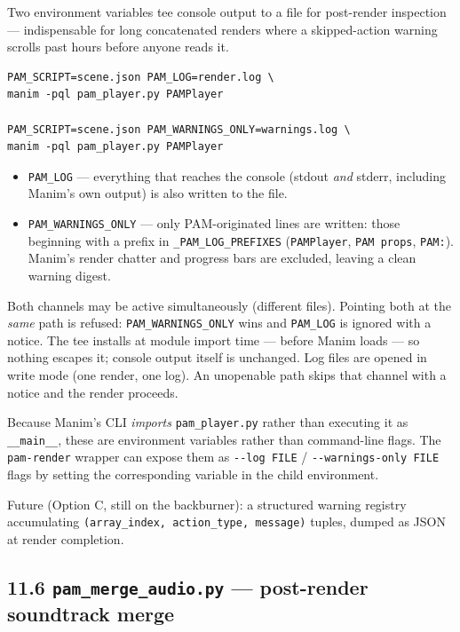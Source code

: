 \documentclass[
  11pt,
]{book}
\begin{document}
Two environment variables tee console output to a file for
post-render inspection --- indispensable for long concatenated
renders where a skipped-action warning scrolls past hours before
anyone reads it.

\begin{verbatim}
PAM_SCRIPT=scene.json PAM_LOG=render.log \
manim -pql pam_player.py PAMPlayer

PAM_SCRIPT=scene.json PAM_WARNINGS_ONLY=warnings.log \
manim -pql pam_player.py PAMPlayer
\end{verbatim}

\begin{itemize}
\item
  \texttt{PAM\_LOG} --- everything that reaches the console (stdout
  \emph{and} stderr, including Manim's own output) is also written to
  the file.
\item
  \texttt{PAM\_WARNINGS\_ONLY} --- only PAM-originated lines are
  written: those beginning with a prefix in
  \texttt{\_PAM\_LOG\_PREFIXES} (\texttt{PAMPlayer},
  \texttt{PAM\ props}, \texttt{PAM:}). Manim's render chatter and
  progress bars are excluded, leaving a clean warning digest.
\end{itemize}

Both channels may be active simultaneously (different files). Pointing
both at the \emph{same} path is refused: \texttt{PAM\_WARNINGS\_ONLY}
wins and \texttt{PAM\_LOG} is ignored with a notice. The tee installs
at module import time --- before Manim loads --- so nothing escapes
it; console output itself is unchanged. Log files are opened in write
mode (one render, one log). An unopenable path skips that channel with
a notice and the render proceeds.

Because Manim's CLI \emph{imports} \texttt{pam\_player.py} rather than
executing it as \texttt{\_\_main\_\_}, these are environment variables
rather than command-line flags. The \texttt{pam-render} wrapper can
expose them as \texttt{-{}-log\ FILE} / \texttt{-{}-warnings-only\ FILE}
flags by setting the corresponding variable in the child environment.

Future (Option C, still on the backburner): a structured warning
registry accumulating \texttt{(array\_index,\ action\_type,\ message)}
tuples, dumped as JSON at render completion.

\subsection{\texorpdfstring{11.6 \texttt{pam\_merge\_audio.py} ---
post-render soundtrack
merge}{11.6 pam\_merge\_audio.py --- post-render soundtrack merge}}\label{pam-merge-audio}
\end{document}
